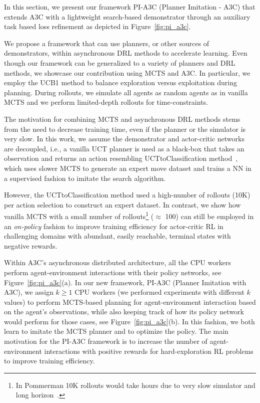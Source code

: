 \documentclass[letterpaper]{article}
\begin{document}
In this section, we present our framework PI-A3C (Planner Imitation - A3C) that extends A3C with a lightweight search-based demonstrator through an auxiliary task based loss refinement as depicted in Figure~\ref{fig:pi_a3c}. %



We propose a framework that can use planners, or other sources of demonstrators, within asynchronous DRL methods to accelerate learning.
Even though our framework can be generalized to a variety of planners and DRL methods, we showcase our contribution using MCTS and A3C. In particular, we employ the UCB1 method to balance exploration versus exploitation during planning. During rollouts, we simulate all agents as random agents as in vanilla MCTS and we perform limited-depth rollouts for time-constraints.

The motivation for combining MCTS and asynchronous DRL methods stems from the need to decrease training time, even if the planner or the simulator is very slow. In this work, we assume the demonstrator and actor-critic networks are decoupled, i.e., a vanilla UCT planner is used as a black-box that takes an observation and returns an action resembling UCTtoClassification method~\cite{guo2014deep}, which uses slower MCTS to generate an expert move dataset and trains a NN in a supervised fashion to imitate the search algorithm.

However, the UCTtoClassification method used a high-number of rollouts (10K) per action selection to construct an expert dataset. In contrast, we show how vanilla MCTS with a small number of rollouts\footnote{In Pommerman 10K rollouts would take hours due to very slow simulator and long horizon~\cite{matiisen2018pommerman}.} ($\approx$ 100) can still be employed in an \textit{on-policy} fashion to improve training efficiency for actor-critic RL in challenging domains with abundant, easily reachable, terminal states with negative rewards.

Within A3C's asynchronous distributed architecture, all the CPU workers perform agent-environment interactions with their policy networks, see Figure~\ref{fig:pi_a3c}(a). In our new framework, PI-A3C (Planner Imitation with A3C), we assign $k\ge 1$ CPU
workers (we performed experiments with different $k$ values) to perform MCTS-based planning for agent-environment interaction based on the agent's observations, while also keeping track of how its policy network would perform for those cases, see Figure~\ref{fig:pi_a3c}(b). In this fashion, we both learn to imitate the MCTS planner and to optimize the policy. The main motivation for the PI-A3C framework is to increase the number of agent-environment interactions with positive rewards for hard-exploration RL problems to improve training efficiency.
\end{document}
